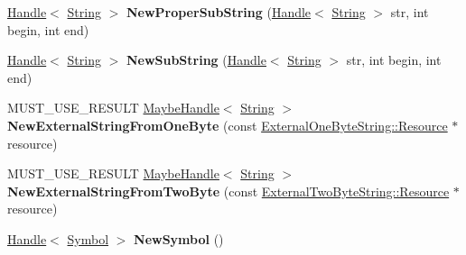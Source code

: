 \begin{DoxyCompactItemize}
\item 
\hyperlink{classv8_1_1internal_1_1_handle}{Handle}$<$ \hyperlink{classv8_1_1internal_1_1_string}{String} $>$ {\bfseries New\+Proper\+Sub\+String} (\hyperlink{classv8_1_1internal_1_1_handle}{Handle}$<$ \hyperlink{classv8_1_1internal_1_1_string}{String} $>$ str, int begin, int end)\hypertarget{classv8_1_1internal_1_1_factory_aca365dc67763f00c5ac9017e2ccdeaf4}{}\label{classv8_1_1internal_1_1_factory_aca365dc67763f00c5ac9017e2ccdeaf4}

\item 
\hyperlink{classv8_1_1internal_1_1_handle}{Handle}$<$ \hyperlink{classv8_1_1internal_1_1_string}{String} $>$ {\bfseries New\+Sub\+String} (\hyperlink{classv8_1_1internal_1_1_handle}{Handle}$<$ \hyperlink{classv8_1_1internal_1_1_string}{String} $>$ str, int begin, int end)\hypertarget{classv8_1_1internal_1_1_factory_a336a349e69dcd995583a2c1ac73d828c}{}\label{classv8_1_1internal_1_1_factory_a336a349e69dcd995583a2c1ac73d828c}

\item 
M\+U\+S\+T\+\_\+\+U\+S\+E\+\_\+\+R\+E\+S\+U\+LT \hyperlink{classv8_1_1internal_1_1_maybe_handle}{Maybe\+Handle}$<$ \hyperlink{classv8_1_1internal_1_1_string}{String} $>$ {\bfseries New\+External\+String\+From\+One\+Byte} (const \hyperlink{classv8_1_1_string_1_1_external_one_byte_string_resource}{External\+One\+Byte\+String\+::\+Resource} $\ast$resource)\hypertarget{classv8_1_1internal_1_1_factory_a26cd320023a11a2e72fa0c3a04ee6494}{}\label{classv8_1_1internal_1_1_factory_a26cd320023a11a2e72fa0c3a04ee6494}

\item 
M\+U\+S\+T\+\_\+\+U\+S\+E\+\_\+\+R\+E\+S\+U\+LT \hyperlink{classv8_1_1internal_1_1_maybe_handle}{Maybe\+Handle}$<$ \hyperlink{classv8_1_1internal_1_1_string}{String} $>$ {\bfseries New\+External\+String\+From\+Two\+Byte} (const \hyperlink{classv8_1_1_string_1_1_external_string_resource}{External\+Two\+Byte\+String\+::\+Resource} $\ast$resource)\hypertarget{classv8_1_1internal_1_1_factory_a7be3ba2e22303abf6819461184969fd8}{}\label{classv8_1_1internal_1_1_factory_a7be3ba2e22303abf6819461184969fd8}

\item 
\hyperlink{classv8_1_1internal_1_1_handle}{Handle}$<$ \hyperlink{classv8_1_1internal_1_1_symbol}{Symbol} $>$ {\bfseries New\+Symbol} ()\hypertarget{classv8_1_1internal_1_1_factory_ac9a416518f1fd9f23b3a8220df318efa}{}\label{classv8_1_1internal_1_1_factory_ac9a416518f1fd9f23b3a8220df318efa}


\end{DoxyCompactItemize}
